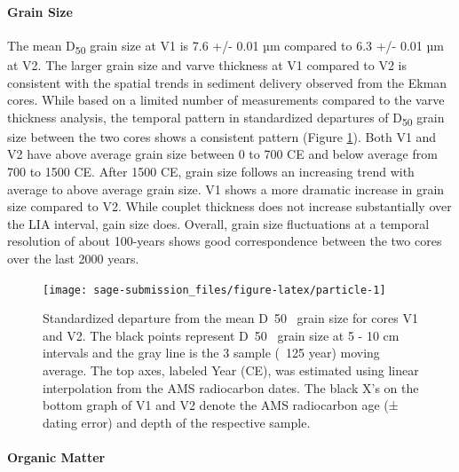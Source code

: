 \documentclass[Royal,times,doublespace,sageh]{sagej}
\begin{document}
\hypertarget{grain-size}{%
\paragraph{Grain Size}\label{grain-size}}

The mean D\textsubscript{50} grain size at V1 is 7.6 +/- 0.01 µm
compared to 6.3 +/- 0.01 µm at V2. The larger grain size and varve
thickness at V1 compared to V2 is consistent with the spatial trends in
sediment delivery observed from the Ekman cores. While based on a
limited number of measurements compared to the varve thickness analysis,
the temporal pattern in standardized departures of D\textsubscript{50}
grain size between the two cores shows a consistent pattern (Figure
\ref{fig:particle}). Both V1 and V2 have above average grain size
between 0 to 700 CE and below average from 700 to 1500 CE. After 1500
CE, grain size follows an increasing trend with average to above average
grain size. V1 shows a more dramatic increase in grain size compared to
V2. While couplet thickness does not increase substantially over the LIA
interval, gain size does. Overall, grain size fluctuations at a temporal
resolution of about 100-years shows good correspondence between the two
cores over the last 2000 years.

\begin{figure}

{\centering \texttt{[image: sage-submission\_files/figure-latex/particle-1]} 

}

\caption{Standardized departure from the mean D~50~ grain size for cores V1 and V2. The black points represent D~50~ grain size at 5 - 10 cm intervals and the gray line is the 3 sample (~125 year) moving average. The top axes, labeled Year (CE), was estimated using linear interpolation from the AMS radiocarbon dates. The black X's on the bottom graph of V1 and V2 denote the AMS radiocarbon age (± dating error) and depth of the respective sample.\label{particle}}\label{fig:particle}
\end{figure}

\hypertarget{organic-matter}{%
\paragraph{Organic Matter}\label{organic-matter}}
\end{document}
